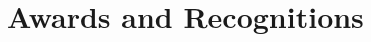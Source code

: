 \documentclass[a4paper,11pt]{article}
\begin{document}
\section{Awards and Recognitions}
\end{document}
